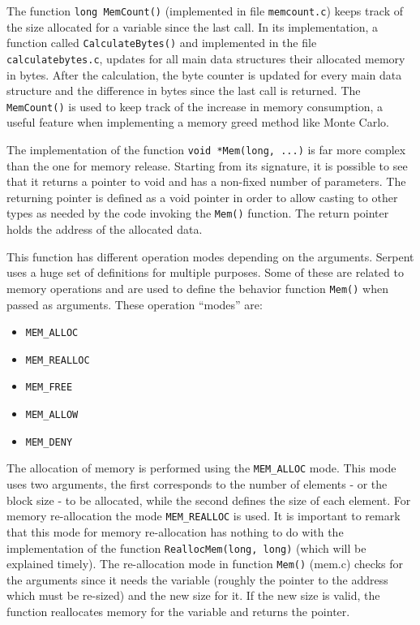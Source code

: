 \documentclass[twoside,a4paper,12pt,english]{anstrans}
\begin{document}
The function \texttt{long MemCount()} (implemented in file \texttt{memcount.c}) keeps track
of the size allocated for a variable since the last
call. In its implementation, a function called \texttt{CalculateBytes()} and implemented in the file
\texttt{calculatebytes.c}, updates for all main data structures their allocated memory in bytes.
After the calculation, the byte counter is updated for every main data structure and the difference
in bytes since the last call is returned. The \texttt{MemCount()} is used to keep track of the increase
in memory consumption, a useful feature when implementing a memory greed method like Monte Carlo.

  

The implementation of the function \texttt{void *Mem(long, ...)} is far more complex than the one for
memory release. Starting from its signature, it is possible to see that it returns a pointer to void
and has a non-fixed number of parameters. The returning pointer is defined as a void pointer in order
to allow casting to other types as needed by the code invoking the \texttt{Mem()}
function. The return pointer holds the address of the allocated data.

This function has different operation modes depending on the arguments. Serpent uses a huge set of definitions for
multiple purposes. Some of these are related to memory operations and are used to define the behavior function \texttt{Mem()}
when passed as arguments. These operation ``modes'' are:


\begin{itemize}
\item \texttt{MEM\_ALLOC}
\item \texttt{MEM\_REALLOC}
\item \texttt{MEM\_FREE}
\item \texttt{MEM\_ALLOW}
\item \texttt{MEM\_DENY}
\end{itemize} 

The allocation of memory is performed using the \texttt{MEM\_ALLOC} mode. This mode uses two arguments, the first
corresponds to the number of elements - or the block size - to be allocated, while the second defines the size of each element.
For memory re-allocation the mode \texttt{MEM\_REALLOC} is used. It is important to remark that this mode for memory re-allocation
has nothing to do with the implementation of the function \texttt{ReallocMem(long, long)} (which will be explained timely). The re-allocation mode
in function \texttt{Mem()} (mem.c) checks for the arguments since it needs the variable (roughly the pointer to the address which must
be re-sized) and the new size for it. If the new size is valid, the function reallocates memory for the variable and returns the pointer.
\end{document}
